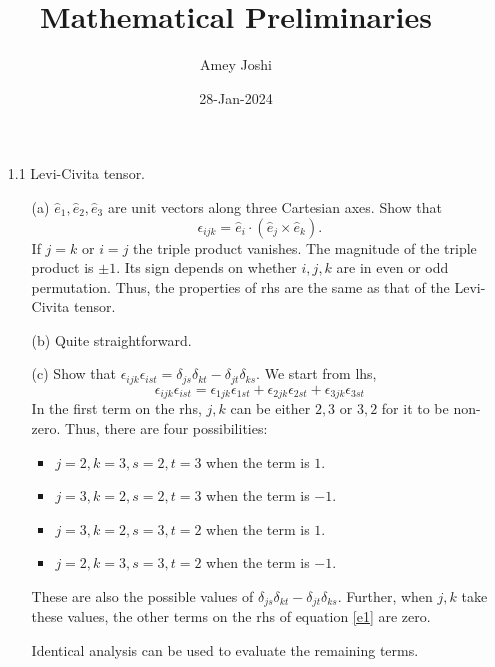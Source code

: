 \documentclass{article}
\title{Mathematical Preliminaries}\label{c1}
\author{Amey Joshi}
\date{28-Jan-2024}
\begin{document}
\maketitle
\begin{enumerate}
\item[1.1] Levi-Civita tensor.
\begin{enumerate}
\item[(a)] $\hat{e}_1, \hat{e}_2, \hat{e}_3$ are unit vectors along three 
Cartesian axes. Show that
\[
\epsilon_{ijk} = \hat{e}_i\cdot(\hat{e}_j \times \hat{e}_k).
\]
If $j = k$ or $i = j$ the triple product vanishes. The magnitude of the
triple product is $\pm 1$. Its sign depends on whether $i, j, k$ are in
even or odd permutation. Thus, the properties of rhs are the same as that of
the Levi-Civita tensor.

\item[(b)] Quite straightforward.

\item[(c)] Show that $\epsilon_{ijk}\epsilon_{ist} = \delta_{js}\delta_{kt} 
- \delta_{jt}\delta_{ks}$.
We start from lhs,
\begin{equation}\label{e1}
\epsilon_{ijk}\epsilon_{ist} = \epsilon_{1jk}\epsilon_{1st} +
                              \epsilon_{2jk}\epsilon_{2st} +
                              \epsilon_{3jk}\epsilon_{3st} 
\end{equation}
In the first term on the rhs, $j, k$ can be either $2, 3$ or $3, 2$ for it
to be non-zero. Thus, there are four possibilities:
\begin{itemize}
\item $j = 2, k = 3, s = 2, t = 3$ when the term is $1$.
\item $j = 3, k = 2, s = 2, t = 3$ when the term is $-1$.
\item $j = 3, k = 2, s = 3, t = 2$ when the term is $1$.
\item $j = 2, k = 3, s = 3, t = 2$ when the term is $-1$.
\end{itemize}
These are also the possible values of $\delta_{js}\delta_{kt} - \delta_{jt}
\delta_{ks}$. Further, when $j, k$ take these values, the other terms on
the rhs of equation \eqref{e1} are zero.

Identical analysis can be used to evaluate the remaining terms.


\end{enumerate}
\end{enumerate}
\end{document}
